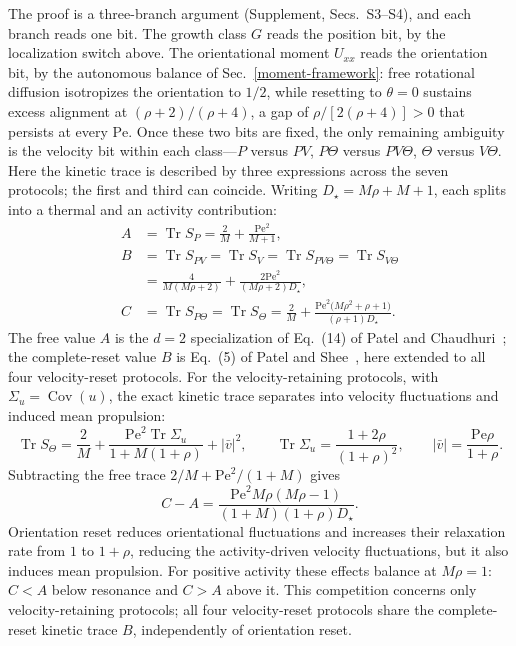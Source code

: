 The proof is a three-branch argument (Supplement, Secs.~S3--S4), and each branch reads one bit. The growth class $G$ reads the position bit, by the localization switch above. The orientational moment $U_{xx}$ reads the orientation bit, by the autonomous balance of Sec.~\ref{moment-framework}: free rotational diffusion isotropizes the orientation to $1/2$, while resetting to $\theta=0$ sustains excess alignment at $(\rho+2)/(\rho+4)$, a gap of $\rho/[2(\rho+4)]>0$ that persists at every $\mathrm{Pe}$. Once these two bits are fixed, the only remaining ambiguity is the velocity bit within each class---$P$ versus $PV$, $P\Theta$ versus $PV\Theta$, $\Theta$ versus $V\Theta$. Here the kinetic trace is described by three expressions across the seven protocols; the first and third can coincide. Writing $D_\star=M\rho+M+1$, each splits into a thermal and an activity contribution:
\[
\begin{aligned}
A&=\operatorname{Tr}S_P=\frac{2}{M}+\frac{\mathrm{Pe}^2}{M+1},\\[3pt]
B&=\operatorname{Tr}S_{PV}=\operatorname{Tr}S_{V}=\operatorname{Tr}S_{PV\Theta}=\operatorname{Tr}S_{V\Theta}\\[1pt]
&=\frac{4}{M(M\rho+2)}+\frac{2\mathrm{Pe}^2}{(M\rho+2)D_\star},\\[3pt]
C&=\operatorname{Tr}S_{P\Theta}=\operatorname{Tr}S_{\Theta}
=\frac{2}{M}+\frac{\mathrm{Pe}^2\bigl(M\rho^2+\rho+1\bigr)}{(\rho+1)D_\star}.
\end{aligned}
\]
The free value $A$ is the $d=2$ specialization of Eq.~(14) of Patel and Chaudhuri~\cite{PatelChaudhuri2023}; the complete-reset value $B$ is Eq.~(5) of Patel and Shee~\cite{PatelShee}, here extended to all four velocity-reset protocols. For the velocity-retaining protocols, with $\Sigma_u=\operatorname{Cov}(u)$, the exact kinetic trace separates into velocity fluctuations and induced mean propulsion:
\[
\operatorname{Tr}S_{\Theta}=\frac{2}{M}+\frac{\mathrm{Pe}^2\operatorname{Tr}\Sigma_u}{1+M(1+\rho)}+|\bar v|^2,
\qquad
\operatorname{Tr}\Sigma_u=\frac{1+2\rho}{(1+\rho)^2},
\qquad
|\bar v|=\frac{\mathrm{Pe}\rho}{1+\rho}.
\]
Subtracting the free trace $2/M+\mathrm{Pe}^2/(1+M)$ gives
\[
C-A=\frac{\mathrm{Pe}^2M\rho(M\rho-1)}{(1+M)(1+\rho)D_\star}.
\]
Orientation reset reduces orientational fluctuations and increases their relaxation rate from $1$ to $1+\rho$, reducing the activity-driven velocity fluctuations, but it also induces mean propulsion. For positive activity these effects balance at $M\rho=1$: $C<A$ below resonance and $C>A$ above it. This competition concerns only velocity-retaining protocols; all four velocity-reset protocols share the complete-reset kinetic trace $B$, independently of orientation reset.

